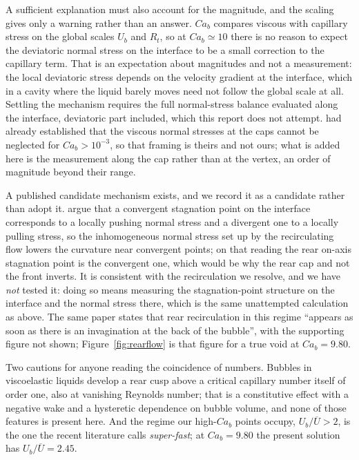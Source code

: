 \documentclass[11pt,a4paper]{article}
\begin{document}
A sufficient explanation must also account for the magnitude, and the scaling
gives only a warning rather than an answer. $Ca_b$ compares viscous with
capillary stress on the global scales $U_b$ and $R_t$, so at $Ca_b\simeq10$
there is no reason to expect the deviatoric normal stress on the interface to be
a small correction to the capillary term. That is an expectation about
magnitudes and not a measurement: the local deviatoric stress depends on the
velocity gradient at the interface, which in a cavity where the liquid barely
moves need not follow the global scale at all. Settling the mechanism requires
the full normal-stress balance evaluated along the interface, deviatoric part
included, which this report does not attempt. \citet{balestra2018viscous} had
already established that the viscous normal stresses at the caps cannot be
neglected for $Ca_b>10^{-3}$, so that framing is theirs and not ours; what is
added here is the measurement along the cap rather than at the vertex, an order
of magnitude beyond their range.

A published candidate mechanism exists, and we record it as a candidate rather
than adopt it. \citet{cappello2025superfast} argue that a convergent
stagnation point on the interface corresponds to a locally pushing normal
stress and a divergent one to a locally pulling stress, so the inhomogeneous
normal stress set up by the recirculating flow lowers the curvature near
convergent points; on that reading the rear on-axis stagnation point is the
convergent one, which would be why the rear cap and not the front inverts. It
is consistent with the recirculation we resolve, and we have \emph{not} tested
it: doing so means measuring the stagnation-point structure on the interface
and the normal stress there, which is the same unattempted calculation as
above. The same paper states that rear recirculation in this regime ``appears
as soon as there is an invagination at the back of the bubble'', with the
supporting figure not shown; Figure~\ref{fig:rearflow} is that figure for a
true void at $Ca_b=9.80$.

Two cautions for anyone reading the coincidence of numbers. Bubbles in
viscoelastic liquids develop a rear cusp above a critical capillary number
itself of order one, also at vanishing Reynolds number; that is a constitutive
effect with a negative wake and a hysteretic dependence on bubble volume, and
none of those features is present here. And the regime our high-$Ca_b$ points
occupy, $U_b/\overline U>2$, is the one the recent literature calls
\emph{super-fast}; at $Ca_b=9.80$ the present solution has
$U_b/\overline U=2.45$.
\end{document}
